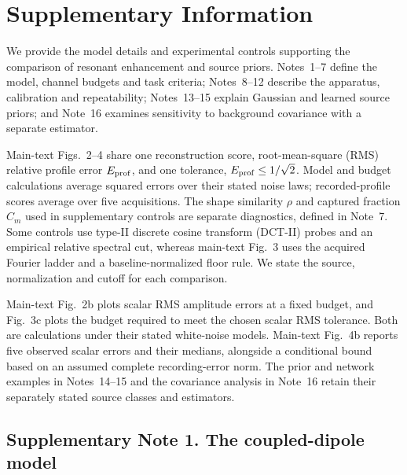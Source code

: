 \documentclass[pdflatex,sn-nature]{sn-jnl}%
\begin{document}
\section*{Supplementary Information}
\label{sec:supp}

We provide the model details and experimental controls supporting the comparison of resonant enhancement and source priors. Notes~1--7 define the model, channel budgets and task criteria; Notes~8--12 describe the apparatus, calibration and repeatability; Notes~13--15 explain Gaussian and learned source priors; and Note~16 examines sensitivity to background covariance with a separate estimator.

Main-text Figs.~2--4 share one reconstruction score, root-mean-square (RMS) relative profile error $E_{\rm prof}$, and one tolerance, $E_{\rm prof}\le1/\sqrt2$. Model and budget calculations average squared errors over their stated noise laws; recorded-profile scores average over five acquisitions. The shape similarity $\rho$ and captured fraction $C_m$ used in supplementary controls are separate diagnostics, defined in Note~7. Some controls use type-II discrete cosine transform (DCT-II) probes and an empirical relative spectral cut, whereas main-text Fig.~3 uses the acquired Fourier ladder and a baseline-normalized floor rule. We state the source, normalization and cutoff for each comparison.

Main-text Fig.~2b plots scalar RMS amplitude errors at a fixed budget, and Fig.~3c plots the budget required to meet the chosen scalar RMS tolerance. Both are calculations under their stated white-noise models. Main-text Fig.~4b reports five observed scalar errors and their medians, alongside a conditional bound based on an assumed complete recording-error norm. The prior and network examples in Notes~14--15 and the covariance analysis in Note~16 retain their separately stated source classes and estimators.

\subsection*{Supplementary Note 1. The coupled-dipole model}
\end{document}
